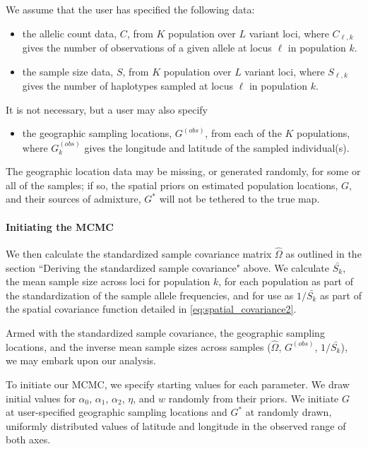 \documentclass[12pt]{article}
\newcommand{\identifyadmixsource}[1]{{#1^{*}}}
\begin{document}
We assume that the user has specified the following data: 
\begin{itemize}
\item the allelic count data, $C$, from $K$ population over $L$ variant loci, where $C_{\ell,k}$ gives the number of observations of a given allele at locus $\ell$ in population $k$. 
\item the sample size data, $S$, from $K$ population over $L$ variant loci, where $S_{\ell,k}$ gives the number of haplotypes sampled at locus $\ell$ in population $k$.
\end{itemize}

It is not necessary, but a user may also specify 
\begin{itemize}
\item the geographic sampling locations, $G^{(obs)}$, from each of the $K$ populations, where $G^{(obs)}_k$ gives the longitude and latitude of the sampled individual(s).
\end{itemize}

The geographic location data may be missing, or generated randomly, for some or all of the samples; if so, the spatial priors on estimated population locations, $G$, and their sources of admixture, $\identifyadmixsource{G}$ will not be tethered to the true map. 

\paragraph{Initiating the MCMC}
We then calculate the standardized sample covariance matrix $\widehat{\Omega}$ as outlined in the section ``Deriving the standardized sample covariance" above.  We calculate $\bar{S_k}$, the mean sample size across loci for population $k$, for each population as part of the standardization of the sample allele frequencies, and for use as $1/\bar{S_k}$ as part of the spatial covariance function detailed in \eqref{eq:spatial_covariance2}.

Armed with the standardized sample covariance, the geographic sampling locations, and the inverse mean sample sizes across samples ($\widehat{\Omega}$, $G^{(obs)}$, $1/\bar{S_k}$), we may embark upon our analysis.

To initiate our MCMC, we specify starting values for each parameter.  We draw initial values for $\alpha_0$, $\alpha_1$, $\alpha_2$, $\eta$, and $w$ randomly from their priors.  We initiate $G$ at user-specified geographic sampling locations and $\identifyadmixsource{G}$ at randomly drawn, uniformly distributed values of latitude and longitude in the observed range of both axes.  
\end{document}
